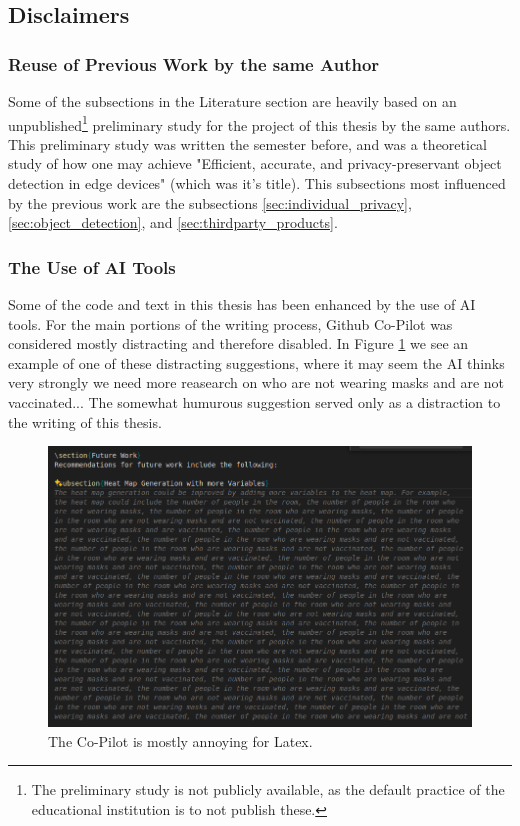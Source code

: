 \subsection{Disclaimers}
\label{sec:disclaimers}

\subsubsection{Reuse of Previous Work by the same Author}
\label{sec:disclaimer_reuse}
Some of the subsections in the Literature section are heavily based on an unpublished\footnote{The preliminary study is not publicly available, as the default practice of the educational institution is to not publish these.} preliminary study for the project of this thesis by the same authors. This preliminary study was written the semester before, and was a theoretical study of how one may achieve "Efficient, accurate, and
privacy-preservant object detection in edge devices" (which was it's title). This subsections most influenced by the previous work are the subsections \ref{sec:individual_privacy}, \ref{sec:object_detection}, and \ref{sec:thirdparty_products}.

\subsubsection{The Use of AI Tools}
Some of the code and text in this thesis has been enhanced by the use of AI tools. For the main portions of the writing process, Github Co-Pilot was considered mostly distracting and therefore disabled. In Figure \ref{fig:co-pilot_distracting} we see an example of one of these distracting suggestions, where it may seem the AI thinks very strongly we need more reasearch on who are not wearing masks and are not vaccinated... The somewhat humurous suggestion served only as a distraction to the writing of this thesis. 

\begin{figure}[H]
	\centering
	\includegraphics[width=\textwidth]{Images/Fun/co_pilot_distracting.png}
	\caption{The Co-Pilot is mostly annoying for Latex.}
	\label{fig:co-pilot_distracting}
\end{figure}


